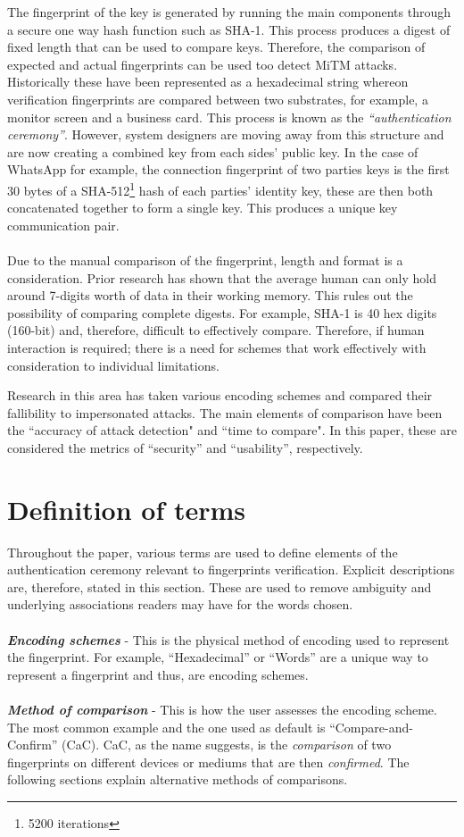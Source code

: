 The fingerprint of the key is generated by running the main components through a secure one way hash function such as SHA-1. This process produces a digest of fixed length that can be used to compare keys. Therefore, the comparison of expected and actual fingerprints can be used too detect MiTM attacks.
Historically these have been represented as a hexadecimal string whereon verification fingerprints are compared between two substrates, for example, a monitor screen and a business card.
This process is known as the \textit{``authentication ceremony''}. However, system designers are moving away from this structure and are now creating a combined key from each sides' public key. In the case of WhatsApp for example, the connection fingerprint of two parties keys is the first 30 bytes of a SHA-512\footnote{5200 iterations} hash of each parties' identity key, these are then both concatenated together to form a single key\cite{whatsapp2017paper}. This produces a unique key communication pair.
\\\\
Due to the manual comparison of the fingerprint, length and format is a consideration. Prior research has shown that the average human can only hold around 7-digits worth of data in their working memory\cite{miller1956magical}. This rules out the possibility of comparing complete digests. For example, SHA-1 is 40 hex digits (160-bit) and, therefore, difficult to effectively compare. Therefore, if human interaction is required; there is a need for schemes that work effectively with consideration to individual limitations.

Research in this area has taken various encoding schemes and compared their fallibility to impersonated attacks. The main elements of comparison have been the ``accuracy of attack detection" and ``time to compare". In this paper, these are considered the metrics of ``security'' and ``usability'', respectively.

\section*{Definition of terms}
Throughout the paper, various terms are used to define elements of the authentication ceremony relevant to fingerprints verification. Explicit descriptions are, therefore, stated in this section. These are used to remove ambiguity and underlying associations readers may have for the words chosen.
\\\\
\textbf{\textit{Encoding schemes}} - This is the physical method of encoding used to represent the fingerprint. For example, ``Hexadecimal'' or ``Words'' are a unique way to represent a fingerprint and thus, are encoding schemes.
\\\\
\textbf{\textit{Method of comparison}} - This is how the user assesses the encoding scheme. The most common example and the one used as default is ``Compare-and-Confirm'' (CaC). CaC, as the name suggests, is the \textit{comparison} of two fingerprints on different devices or mediums that are then \textit{confirmed}. The following sections explain alternative methods of comparisons.

